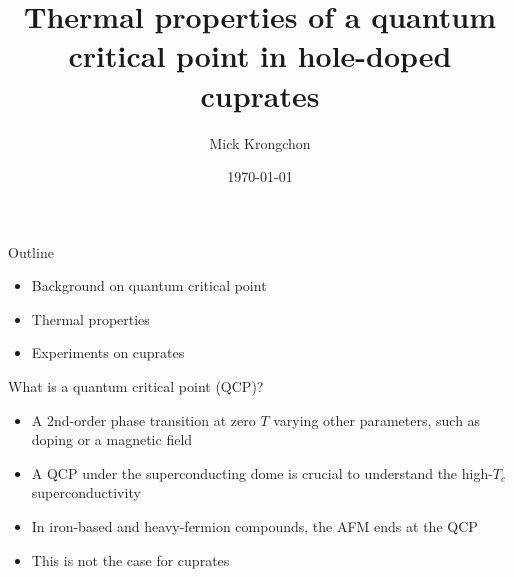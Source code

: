 \documentclass{beamer}
\title[]{Thermal properties of a quantum critical point in hole-doped cuprates}
\author{Mick Krongchon}
\institute{University of Illinois at Urbana-Champaign}
\date{\today}
\begin{document}
\begin{frame}
\titlepage
\end{frame}


\begin{frame}{Outline}
\begin{itemize}
\item Background on quantum critical point
\item Thermal properties
\item Experiments on cuprates
\end{itemize}
\end{frame}

\begin{frame}{What is a quantum critical point (QCP)?}
\begin{itemize}
\item A 2nd-order phase transition at zero $T$ varying other parameters, such as doping or a magnetic field
\item A QCP under the superconducting dome is crucial to understand the high-$T_c$ superconductivity
\item In iron-based and heavy-fermion compounds, the AFM ends at the QCP
\item This is not the case for cuprates
\end{itemize}
\end{frame}
\end{document}
